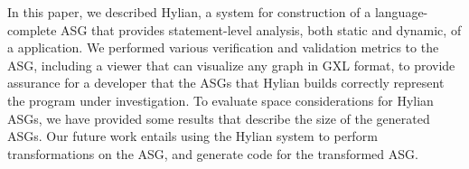 

In this paper, we described Hylian, a system for construction
of a language-complete ASG that provides statement-level
analysis, both static and dynamic, of a {\CPP} application.
We performed various verification and validation metrics to the ASG,
including a viewer that can visualize any graph in GXL format,
to provide assurance for a developer that the ASGs that Hylian builds
correctly represent the program under investigation.
To evaluate space considerations for Hylian ASGs, we have
provided some results that describe the size of the generated
ASGs.  Our future work entails using the Hylian system to
perform transformations on the ASG, and generate {\CPP}
code for the transformed ASG.

